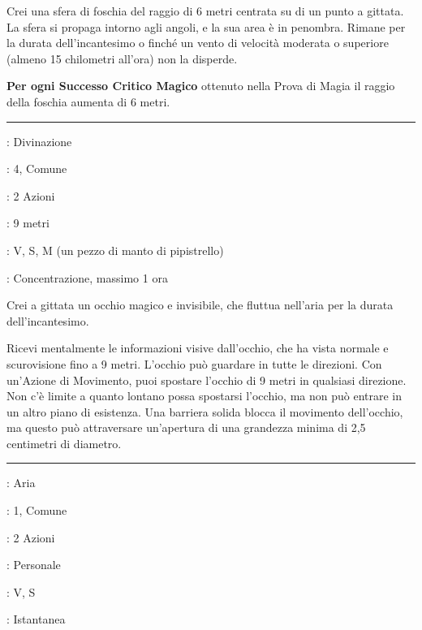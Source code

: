 \begin{multicols}{2}
Crei una sfera di foschia del raggio di 6 metri centrata su di un punto a gittata. La sfera si propaga intorno agli angoli, e la sua area è in penombra. Rimane per la durata dell'incantesimo o finché un vento di velocità moderata o superiore (almeno 15 chilometri all'ora) non la disperde.

\textbf{Per ogni Successo Critico Magico} ottenuto nella Prova di Magia il raggio della foschia aumenta di 6 metri.

\smallskip\noindent\rule{\linewidth}{2pt} \hypertarget{Occhio Arcano}{}\smallskip{}
\noindent
\begin{description}[noitemsep, topsep=0pt, parsep=0pt, partopsep=0pt, leftmargin=0cm, labelwidth=2.8cm]
	\item[\textbf{Lista di Magia}]: Divinazione
	\item[\textbf{Livello}]: 4, Comune
	\item[\textbf{T. di Lancio}]: 2 Azioni
	\item[\textbf{Gittata}]: 9 metri
	\item[\textbf{Componenti}]: V, S, M (un pezzo di manto di pipistrello)
	\item[\textbf{Durata}]: Concentrazione, massimo 1 ora
\end{description}

Crei a gittata un occhio magico e invisibile, che fluttua nell'aria per la durata dell'incantesimo.

Ricevi mentalmente le informazioni visive dall'occhio, che ha vista normale e scurovisione fino a 9 metri. L'occhio può guardare in tutte le direzioni. Con un'Azione di Movimento, puoi spostare l'occhio di 9 metri in qualsiasi direzione. Non c'è limite a quanto lontano possa spostarsi l'occhio, ma non può entrare in un altro piano di esistenza. Una barriera solida blocca il movimento dell'occhio, ma questo può attraversare un'apertura di una grandezza minima di 2,5 centimetri di diametro.

\smallskip\noindent\rule{\linewidth}{2pt} \hypertarget{Onda Tonante}{}\smallskip{}
\noindent
\begin{description}[noitemsep, topsep=0pt, parsep=0pt, partopsep=0pt, leftmargin=0cm, labelwidth=2.8cm]
	\item[\textbf{Lista di Magia}]: Aria
	\item[\textbf{Livello}]: 1, Comune
	\item[\textbf{T. di Lancio}]: 2 Azioni
	\item[\textbf{Gittata}]: Personale
	\item[\textbf{Componenti}]: V, S
	\item[\textbf{Durata}]: Istantanea
\end{description}


\end{multicols}

